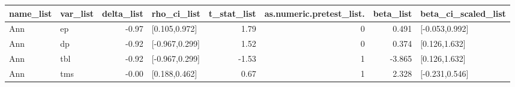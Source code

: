 \begin{table}[ht]
\centering
\begin{tabular}{llrlrrrl}
  \hline
name\_list & var\_list & delta\_list & rho\_ci\_list & t\_stat\_list & as.numeric.pretest\_list. & beta\_list & beta\_ci\_scaled\_list \\ 
  \hline
Ann & ep & -0.97 & [0.105,0.972] & 1.79 & 0 & 0.491 & [-0.053,0.992] \\ 
  Ann & dp & -0.92 & [-0.967,0.299] & 1.52 & 0 & 0.374 & [0.126,1.632] \\ 
  Ann & tbl & -0.92 & [-0.967,0.299] & -1.53 & 1 & -3.865 & [0.126,1.632] \\ 
  Ann & tms & -0.00 & [0.188,0.462] & 0.67 & 1 & 2.328 & [-0.231,0.546] \\ 
   \hline
\end{tabular}
\end{table}
